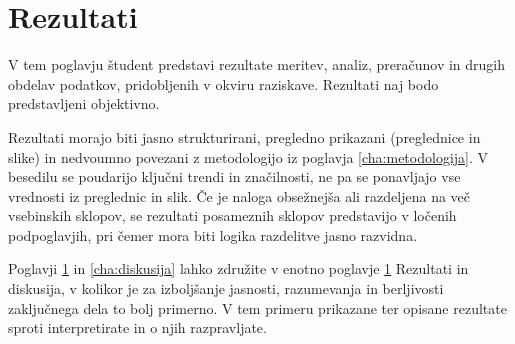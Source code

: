 \chapter{Rezultati}\label{cha:rezultati}
V tem poglavju študent predstavi rezultate meritev, analiz, preračunov in drugih obdelav podatkov, pridobljenih v okviru raziskave. Rezultati naj bodo predstavljeni objektivno.

Rezultati morajo biti jasno strukturirani, pregledno prikazani (preglednice in slike) in nedvoumno povezani z metodologijo iz poglavja \ref{cha:metodologija}. V besedilu se poudarijo ključni trendi in značilnosti, ne pa se ponavljajo vse vrednosti iz preglednic in slik. Če je naloga obsežnejša ali razdeljena na več vsebinskih sklopov, se rezultati posameznih sklopov predstavijo v ločenih podpoglavjih, pri čemer mora biti logika razdelitve jasno razvidna.

Poglavji \ref{cha:rezultati} in \ref{cha:diskusija} lahko združite v enotno poglavje \ref{cha:rezultati} Rezultati in diskusija, v kolikor je za izboljšanje jasnosti, razumevanja in berljivosti zaključnega dela to bolj primerno. V tem primeru prikazane ter opisane rezultate sproti interpretirate in o njih razpravljate.
